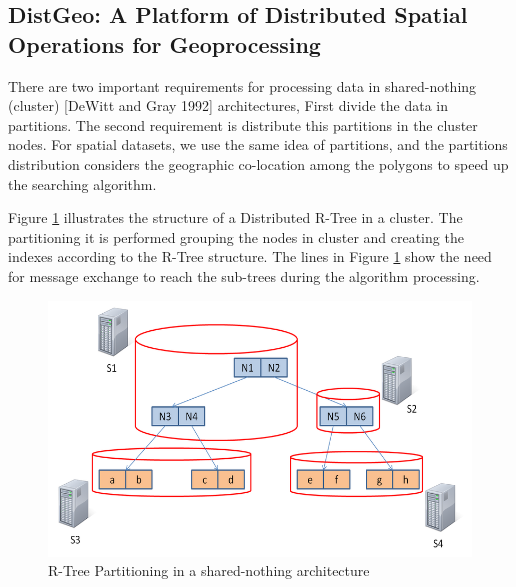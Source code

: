 \subsection{DistGeo: A Platform of Distributed Spatial Operations for Geoprocessing}

There are two important requirements for processing data in shared-nothing (cluster) [DeWitt and Gray 1992] architectures, First divide the data in partitions. The second requirement is distribute this partitions in the cluster nodes. For spatial datasets, we use the same idea of partitions, and the partitions distribution considers the geographic co-location among the polygons to speed up the searching algorithm.

Figure \ref{fig:partitioning} illustrates the structure of a Distributed R-Tree in a cluster. The partitioning it is performed grouping the nodes in cluster and creating the indexes according to the R-Tree structure. The lines in Figure \ref{fig:partitioning} show the need for message exchange to reach the sub-trees during the algorithm processing.

\begin{figure}[ht]
\centering
\includegraphics[width=.5\textwidth]{r-tree-partiotioning.png}
\caption{R-Tree Partitioning in a shared-nothing architecture}
\label{fig:partitioning}
\end{figure}


